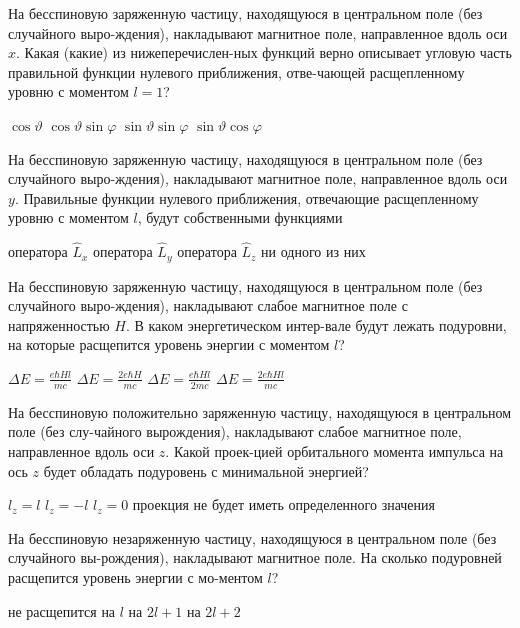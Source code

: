 \documentclass[11pt,a4paper]{exam}
\begin{document}
\begin{questions}
\question На бесспиновую заряженную частицу, находящуюся в центральном поле (без случайного выро-ждения), накладывают магнитное поле, направленное вдоль оси $x$. Какая (какие) из нижеперечислен-ных функций верно описывает угловую часть правильной функции нулевого приближения, отве-чающей расщепленному уровню с моментом $l = 1$?
\begin{choices}
\choice $\cos \vartheta $  
\choice $\cos \vartheta \sin \varphi $    
\choice $\sin \vartheta \sin \varphi $    
\choice $\sin \vartheta \cos \varphi $
\end{choices}

\question На бесспиновую заряженную частицу, находящуюся в центральном поле (без случайного выро-ждения), накладывают магнитное поле, направленное вдоль оси $y$. Правильные функции нулевого приближения, отвечающие расщепленному уровню с моментом $l$, будут собственными функциями
\begin{choices}
\choice оператора ${\hat L_x}$  
\choice оператора ${\hat L_y}$  
\choice оператора ${\hat L_z}$  
\choice ни одного из них
\end{choices}

\question На бесспиновую заряженную частицу, находящуюся в центральном поле (без случайного выро-ждения), накладывают слабое магнитное поле с напряженностью $H$. В каком энергетическом интер-вале будут лежать подуровни, на которые расщепится уровень энергии с моментом $l$?
\begin{choices}
\choice $\Delta E = \frac{{e\hbar Hl}}{{mc}}$  
\choice $\Delta E = \frac{{2e\hbar H}}{{mc}}$  
\choice $\Delta E = \frac{{e\hbar Hl}}{{2mc}}$    
\choice $\Delta E = \frac{{2e\hbar Hl}}{{mc}}$
\end{choices}

\question На бесспиновую положительно заряженную частицу, находящуюся в центральном поле (без слу-чайного вырождения), накладывают слабое магнитное поле, направленное вдоль оси $z$. Какой проек-цией орбитального момента импульса на ось $z$ будет обладать подуровень с минимальной энергией?
\begin{choices}
\choice ${l_z} = l$ 
\choice ${l_z} =  - l$ 
\choice ${l_z} = 0$ 
\choice проекция не будет иметь определенного значения
\end{choices}

\question На бесспиновую незаряженную частицу, находящуюся в центральном поле (без случайного вы-рождения), накладывают магнитное поле. На сколько подуровней расщепится уровень энергии с мо-ментом $l$?
\begin{choices}
\choice не расщепится  
\choice на $l$      
\choice на $2l + 1$    
\choice на $2l + 2$
\end{choices}


\end{questions}
\end{document}
